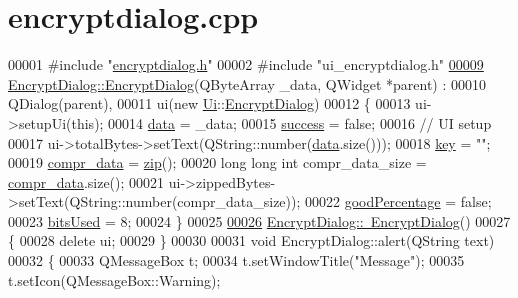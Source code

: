 \hypertarget{encryptdialog_8cpp_source}{}\section{encryptdialog.\+cpp}

\begin{DoxyCode}
00001 \textcolor{preprocessor}{#include "\hyperlink{encryptdialog_8h}{encryptdialog.h}"}
00002 \textcolor{preprocessor}{#include "ui\_encryptdialog.h"}
\hypertarget{encryptdialog_8cpp_source.tex_l00009}{}\hyperlink{class_encrypt_dialog_ab57e8b3a0d00c977e81f3b356657524e}{00009} \hyperlink{class_encrypt_dialog_ab57e8b3a0d00c977e81f3b356657524e}{EncryptDialog::EncryptDialog}(QByteArray \_data, QWidget *parent) :
00010     QDialog(parent),
00011     ui(new \hyperlink{namespace_ui}{Ui}::\hyperlink{class_encrypt_dialog}{EncryptDialog})
00012 \{
00013     ui->setupUi(\textcolor{keyword}{this});
00014     \hyperlink{class_encrypt_dialog_acf3a8bbce90d99ef17fec093c35b1008}{data} = \_data;
00015     \hyperlink{class_encrypt_dialog_ada4900bcd40894d9c098c65aa4066ac9}{success} = \textcolor{keyword}{false};
00016     \textcolor{comment}{// UI setup}
00017     ui->totalBytes->setText(QString::number(\hyperlink{class_encrypt_dialog_acf3a8bbce90d99ef17fec093c35b1008}{data}.size()));
00018     \hyperlink{class_encrypt_dialog_a1afdef3c665fb0d0fae06d1df8e84951}{key} = \textcolor{stringliteral}{""};
00019     \hyperlink{class_encrypt_dialog_a3e8998aa39696cbd1242f6420ef18143}{compr\_data} = \hyperlink{class_encrypt_dialog_a2bff820a3df4ddc36ecb07ed74b7138a}{zip}();
00020     \textcolor{keywordtype}{long} \textcolor{keywordtype}{long} \textcolor{keywordtype}{int} compr\_data\_size = \hyperlink{class_encrypt_dialog_a3e8998aa39696cbd1242f6420ef18143}{compr\_data}.size();
00021     ui->zippedBytes->setText(QString::number(compr\_data\_size));
00022     \hyperlink{class_encrypt_dialog_a0c821b893cfddd7a6c07bbd270ba49e9}{goodPercentage} = \textcolor{keyword}{false};
00023     \hyperlink{class_encrypt_dialog_abf638fea37fbdbaba215954e2e239860}{bitsUsed} = 8;
00024 \}
00025 
\hypertarget{encryptdialog_8cpp_source.tex_l00026}{}\hyperlink{class_encrypt_dialog_a466e283080f87ee50f172052e43e38b6}{00026} \hyperlink{class_encrypt_dialog_a466e283080f87ee50f172052e43e38b6}{EncryptDialog::~EncryptDialog}()
00027 \{
00028     \textcolor{keyword}{delete} ui;
00029 \}
00030 
00031 \textcolor{keywordtype}{void} EncryptDialog::alert(QString text)
00032 \{
00033     QMessageBox t;
00034     t.setWindowTitle(\textcolor{stringliteral}{"Message"});
00035     t.setIcon(QMessageBox::Warning);

\end{DoxyCode}
